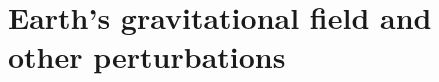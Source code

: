 \documentclass[../main.tex]{subfiles}
\begin{document}
\section{Earth's gravitational field and other perturbations}\label{sec:force}
\end{document}
